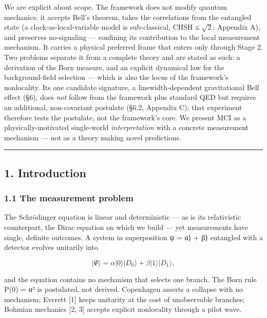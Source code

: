 \documentclass[
]{article}
\begin{document}
We are explicit about scope. The framework does not modify quantum
mechanics: it accepts Bell's theorem, takes the correlations from the
entangled state (a clock-as-local-variable model is sub-classical, CHSH
≤ \(\sqrt{2}\); Appendix A), and preserves no-signaling --- confining
its contribution to the local measurement mechanism. It carries a
physical preferred frame that enters only through Stage 2. Two problems
separate it from a complete theory and are stated as such: a derivation
of the Born measure, and an explicit dynamical law for the
background-field selection --- which is also the locus of the
framework's nonlocality. Its one candidate signature, a
linewidth-dependent gravitational Bell effect (§6), does \emph{not}
follow from the framework plus standard QED but requires an additional,
non-covariant postulate (§6.2, Appendix C); that experiment therefore
tests the postulate, not the framework's core. We present MCI as a
physically-motivated single-world \emph{interpretation} with a concrete
measurement mechanism --- not as a theory making novel predictions.

\begin{center}\rule{0.5\linewidth}{0.5pt}\end{center}

\subsection{1. Introduction}\label{introduction}

\subsubsection{1.1 The measurement
problem}\label{the-measurement-problem}

The Schrödinger equation is linear and deterministic --- as is its
relativistic counterpart, the Dirac equation on which we build --- yet
measurements have single, definite outcomes. A system in superposition ψ
= α⟩ + β⟩ entangled with a detector evolves unitarily
into

\[|\Psi\rangle = \alpha|0\rangle|D_0\rangle + \beta|1\rangle|D_1\rangle,\]

and the equation contains no mechanism that selects one branch. The Born
rule P(0) = \textbar α\textbar² is postulated, not derived. Copenhagen
asserts a collapse with no mechanism; Everett {[}1{]} keeps unitarity at
the cost of unobservable branches; Bohmian mechanics {[}2, 3{]} accepts
explicit nonlocality through a pilot wave.
\end{document}
